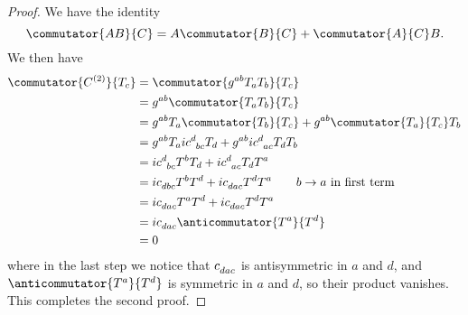 \documentclass[fleqn]{NotesClass}
\begin{document}
\begin{lma}{}{}
\begin{proof}
            We have the identity
            \begin{equation}
                \commutator{AB}{C} = A\commutator{B}{C} + \commutator{A}{C}B.
            \end{equation}
            We then have
            \begin{align}
                \commutator{C^{(2)}}{T_c} &= \commutator{g^{ab}T_aT_b}{T_c}\\
                &= g^{ab}\commutator{T_aT_b}{T_c}\\
                &= g^{ab}T_a\commutator{T_b}{T_c} + g^{ab}\commutator{T_a}{T_c}T_b\\
                &= g^{ab}T_ai\tensor{c}{^d_{bc}}T_d + g^{ab}i\tensor{c}{^d_{ac}}T_dT_b\\
                &= i\tensor{c}{^d_{bc}}T^bT_d + i\tensor{c}{^d_{ac}}T_dT^a\\
                &= i\tensor{c}{_{dbc}}T^bT^d + i\tensor{c}{_{dac}}T^dT^a \qquad b \to a\text{ in first term}\\
                &= i\tensor{c}{_{dac}}T^aT^d + i\tensor{c}{_{dac}}T^dT^a\\
                &= i\tensor{c}{_{dac}}\anticommutator{T^a}{T^d}\\
                &= 0
            \end{align}
            where in the last step we notice that \(\tensor{c}{_{dac}}\) is antisymmetric in \(a\) and \(d\), and \(\anticommutator{T^a}{T^d}\) is symmetric in \(a\) and \(d\), so their product vanishes.
            This completes the second proof.
        \end{proof}
    \end{lma}
    
\end{document}
